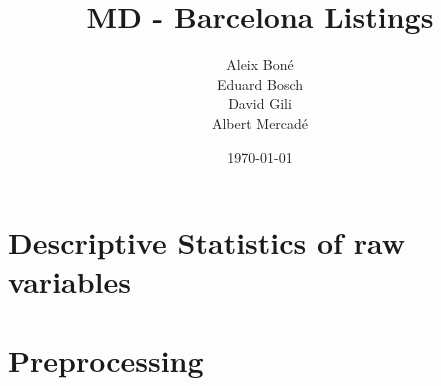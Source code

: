 



\title{MD - \airbnb Barcelona Listings}
\author{
    Aleix Bon\'e\\
    Eduard Bosch\\
    David Gili\\
    Albert Mercad\'e\\
}
\date{\today}






\setcounter{tocdepth}{2}
\tableofcontents

\clearpage


\clearpage

%

\clearpage
\section{Descriptive Statistics of raw variables}%
\label{sec:descriptive_analisis}




\clearpage
\section{Preprocessing}



